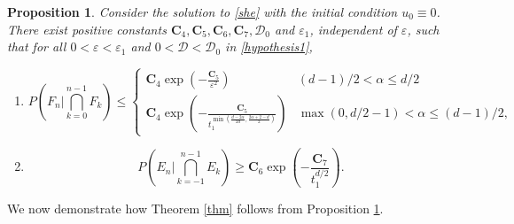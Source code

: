 \documentclass[12pt]{amsart}
\newtheorem{prop}{Proposition}[section]
\numberwithin{equation}{section}
\newcommand{\1}{\mathbf{1}}
\begin{document}
\begin{prop}
\label{prop}
Consider the solution to \eqref{she} with the initial condition $u_0\equiv 0$. There exist positive constants $\textbf{C}_4,\textbf{C}_5,\textbf{C}_6,\textbf{C}_7,\mathcal{D}_0$ and $\varepsilon_1$, independent of $\varepsilon$, such that for all $0<\varepsilon<\varepsilon_1$ and $0<\mathcal{D}<\mathcal{D}_0$ in \eqref{hypothesis1}, 
\begin{enumerate}
\item[(a)]
\begin{equation*}
P\left(F_n\bigg| \bigcap_{k=0}^{n-1}F_k\right)\leq\begin{cases}
    \textbf{C}_4\exp\left(-\frac{\textbf{C}_5}{\varepsilon^2}\right)&(d-1)/2<\alpha\leq d/2\\
    \textbf{C}_4\exp\left(-\frac{\textbf{C}_5}{t_1^{\min\left(\frac{d-2\alpha}{2d},\frac{2\alpha+2-d}{2}\right)}}\right)&\max(0,d/2-1)<\alpha\leq(d-1)/2,
\end{cases}
\end{equation*}
\item[(b)] 
\begin{equation*}
P\left(E_n\bigg| \bigcap_{k=-1}^{n-1}E_k\right)\geq \textbf{C}_6\exp\left(-\frac{\textbf{C}_7}{t_1^{d/2}}\right).
\end{equation*}
\end{enumerate}
\end{prop}
We now demonstrate how Theorem \ref{thm} follows from Proposition \ref{prop}.
\end{document}

